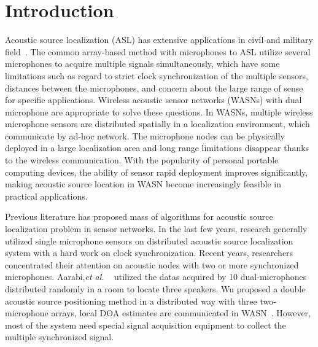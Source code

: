 \section{Introduction}

Acoustic source localization (ASL) has extensive applications in civil and military field~\cite{Meesookho2008,sallai2011acoustic,Liu2017Multiple}. The common array-based
method with microphones to ASL utilize several microphones
to acquire multiple signals simultaneously, which have some
limitations such as regard to strict clock synchronization of the multiple sensors, distances between the microphones,
and concern about the large range of sense for specific applications.  Wireless acoustic sensor networks
(WASNs)  with dual microphone are appropriate to solve these questions. In WASNs, multiple wireless microphone sensors are distributed spatially 
in a localization environment, which communicate by ad-hoc network. The microphone nodes can be physically deployed in a large localization area and long range limitations disappear thanks to the wireless communication. With the popularity of personal portable
computing devices, the ability of sensor rapid deployment improves significantly, making acoustic source location in WASN become increasingly feasible in practical applications.

Previous literature has proposed mass of algorithms for acoustic source localization problem in sensor networks. In the last few years, research generally utilized single microphone sensors on distributed acoustic source localization system  with a hard work on clock synchronization. Recent years, researchers concentrated their attention on acoustic
nodes with two or more synchronized microphones.
Aarabi,\emph{et al.} ~\cite{aarabi1900fusion} utilized the datas acquired by 10 dual-microphones distributed randomly in a room to locate three speakers. Wu proposed a double acoustic source positioning method
in a distributed way with three two-microphone arrays, local DOA estimates are communicated in WASN~\cite{wu2012fusion}. However, most of the system need special signal acquisition equipment to collect the multiple synchronized signal.

